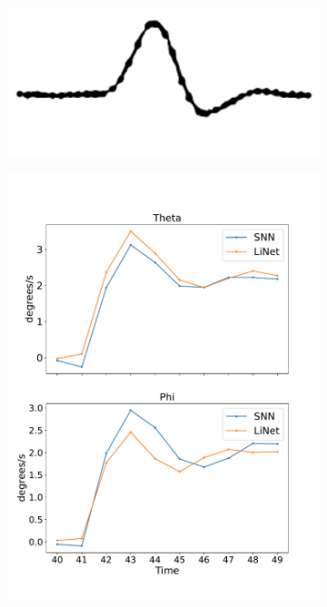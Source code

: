 \documentclass [MS] {UCLAthesis}
\begin{document}
\begin{figure}
    \centering

    \begin{subfigure}{0.2\textwidth}
        \centering
        \includegraphics[width=\textwidth]{saccade_human_vel}
        \caption{}
        \label{fig:saccade_human_vel}
    \end{subfigure}
    \hfill
    \begin{subfigure}{0.2\textwidth}
        \centering
        \includegraphics[width=\textwidth]{saccade_human_vel_normal}

\end{subfigure}
\end{figure}
\end{document}
